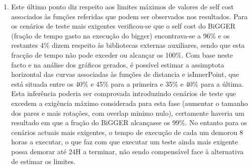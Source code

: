 \begin{enumerate}
	\item{Este último ponto diz respeito aos limites máximos de valores de self cost associados às funções referidas que podem ser observados nos resultados. Para os cenários de teste mais exigentes verificou-se que o self cost do BiGGER (fração de tempo gasto na execução do bigger) encontrava-se a 96\% e os restantes 4\% dizem respeito às bibliotecas externas auxiliares, sendo que esta fracção de tempo não pode exceder ou alcançar os 100\%. Com base neste facto e na análise dos gráficos gerados, é possível estimar a assimptota horizontal das curvas associadas às funções de distancia e isInnerPoint, que está situada entre os 40\% e 45\% para a primeira e 35\% e 40\% para a última. Esta inferência poderia ser comprovada introduzindo cenários de teste que excedem a exigência máximo considerada para esta fase (aumentar o tamanho dos pares e mais rotações, com overlap minimo nulo), certamente haveria um resultado em que a fração do BiGGER alcançasse os 99\%. No entanto para os cenários actuais mais exigentes, o tempo de execução de cada um demorou 8 horas a executar, o que faz com que executar um teste ainda mais exigente possa demorar até 24H a terminar, não sendo compensável face à alternativa de estimar os limites.  }
\end{enumerate}
% 


%
%
%




